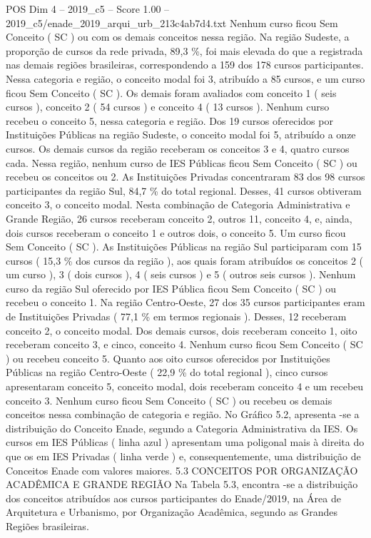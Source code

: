 \begin{textsample}{POS Dim 4 – 2019\_c5 – Score 1.00 – 2019\_c5/enade\_2019\_arqui\_urb\_213c4ab7d4.txt}
Nenhum curso ficou Sem Conceito ( SC ) ou com os demais conceitos nessa região.
Na região Sudeste, a proporção de cursos da rede privada, 89,3 \%, foi mais elevada do que a registrada nas demais regiões brasileiras, correspondendo a 159 dos 178 cursos participantes.
Nessa categoria e região, o conceito modal foi 3, atribuído a 85 cursos, e um curso ficou Sem Conceito ( SC ).
Os demais foram avaliados com conceito 1 ( seis cursos ), conceito 2 ( 54 cursos ) e conceito 4 ( 13 cursos ).
Nenhum curso recebeu o conceito 5, nessa categoria e região.
Dos 19 cursos oferecidos por Instituições Públicas na região Sudeste, o conceito modal foi 5, atribuído a onze cursos.
Os demais cursos da região receberam os conceitos 3 e 4, quatro cursos cada.
Nessa região, nenhum curso de IES Públicas ficou Sem Conceito ( SC ) ou recebeu os conceitos ou 2.
As Instituições Privadas concentraram 83 dos 98 cursos participantes da região Sul, 84,7 \% do total regional.
Desses, 41 cursos obtiveram conceito 3, o conceito modal.
Nesta combinação de Categoria Administrativa e Grande Região, 26 cursos receberam conceito 2, outros 11, conceito 4, e, ainda, dois cursos receberam o conceito 1 e outros dois, o conceito 5.
Um curso ficou Sem Conceito ( SC ).
As Instituições Públicas na região Sul participaram com 15 cursos ( 15,3 \% dos cursos da região ), aos quais foram atribuídos os conceitos 2 ( um curso ), 3 ( dois cursos ), 4 ( seis cursos ) e 5 ( outros seis cursos ).
Nenhum curso da região Sul oferecido por IES Pública ficou Sem Conceito ( SC ) ou recebeu o conceito 1.
Na região Centro-Oeste, 27 dos 35 cursos participantes eram de Instituições Privadas ( 77,1 \% em termos regionais ).
Desses, 12 receberam conceito 2, o conceito modal.
Dos demais cursos, dois receberam conceito 1, oito receberam conceito 3, e cinco, conceito 4.
Nenhum curso ficou Sem Conceito ( SC ) ou recebeu conceito 5.
Quanto aos oito cursos oferecidos por Instituições Públicas na região Centro-Oeste ( 22,9 \% do total regional ), cinco cursos apresentaram conceito 5, conceito modal, dois receberam conceito 4 e um recebeu conceito 3.
Nenhum curso ficou Sem Conceito ( SC ) ou recebeu os demais conceitos nessa combinação de categoria e região.
No Gráfico 5.2, apresenta -se a distribuição do Conceito Enade, segundo a Categoria Administrativa da IES.
Os cursos em IES Públicas ( linha azul ) apresentam uma poligonal mais à direita do que os em IES Privadas ( linha verde ) e, consequentemente, uma distribuição de Conceitos Enade com valores maiores. 5.3 CONCEITOS POR ORGANIZAÇÃO ACADÊMICA E GRANDE REGIÃO Na Tabela 5.3, encontra -se a distribuição dos conceitos atribuídos aos cursos participantes do Enade/2019, na Área de Arquitetura e Urbanismo, por Organização Acadêmica, segundo as Grandes Regiões brasileiras.

\end{textsample}
